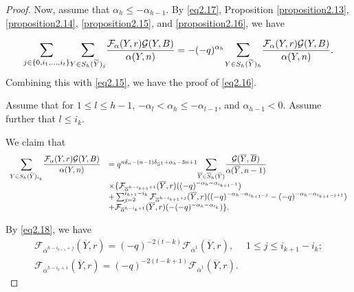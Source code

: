 \documentclass[11pt,oneside]{amsart}
\theoremstyle{plain}
\theoremstyle{definition}
\theoremstyle{remark}
\newcommand{\CF}{{\mathcal F}}
\newcommand{\CG}{{\mathcal G}}
\numberwithin{equation}{section}
\begin{document}
\begin{proof}
		Now, assume that $\alpha_h \leq -\alpha_{h-1}$. By \eqref{eq2.17}, Proposition \ref{proposition2.13}, \ref{proposition2.14}, \ref{proposition2.15}, and \ref{proposition2.16}, we have
		
		\begin{equation*}	\mathlarger{\sum}_{j \in \lbrace 0,i_1,\dots,i_t \rbrace}\mathlarger{\sum}_{Y \in S_h(\widetilde{Y})_{j}}	\dfrac{\CF_{\alpha}(Y,r)\CG(Y,B)}{\alpha(Y,n)}=-(-q)^{\alpha_h}\mathlarger{\sum}_{Y \in S_h(\widetilde{Y})_{h}}	\dfrac{\CF_{\alpha}(Y,r)\CG(Y,B)}{\alpha(Y,n)}.
		\end{equation*}
		Combining this with \eqref{eq2.15}, we have the proof of \eqref{eq2.16}. 
		
		
		
		Assume that for $1 \leq l \leq h-1$, $-\alpha_l<\alpha_h \leq -\alpha_{l-1}$, and $\alpha_{h-1}<0$.
		Assume further that $l \leq  i_k$. 
		
		We claim that
		\begin{equation}\label{eq2.20}\begin{array}{ll}
				\mathlarger{\sum}_{Y \in S_h(\widetilde{Y})_{i_k}}	\dfrac{\CF_{\alpha}(Y,r)\CG(Y,B)}{\alpha(Y,n)}&=q^{n\delta_{\alpha}-(n-1)\delta_{\overline{\alpha}^1}+\alpha_h-3n+1}\mathlarger{\sum}_{\overline{Y} \in \overline{S}_h(\widetilde{Y})}\dfrac{\CG(\overline{Y},\overline{B})}{\alpha(\overline{Y},n-1)}\\
				&\times \lbrace \CF_{\overline{\alpha}^{h-i_{k+1}+1}}(\overline{Y},r)((-q)^{-\alpha_h-\alpha_{i_{k+1}-1}})\\
				&+\sum_{j=2}^{i_{k+1}-i_k} \CF_{\overline{\alpha}^{h-i_{k+1}+j}}(\overline{Y},r)((-q)^{-\alpha_h-\alpha_{i_{k+1}-j}}-(-q)^{-\alpha_h-\alpha_{i_{k+1}-j+1}})\\
				&+\CF_{\overline{\alpha}^{h-i_{k}+1}}(\overline{Y},r)(-(-q)^{-\alpha_h-\alpha_{i_{k}}}) \rbrace.
			\end{array}
		\end{equation}
		
		By \eqref{eq2.18}, we have
		\begin{equation*}\begin{array}{ll}
				\CF_{\overline{\alpha}^{h-i_{k+1}+j}}(\overline{Y},r)=(-q)^{-2(t-k)}\CF_{\overline{\alpha}^1}(\overline{Y},r), & 1 \leq j \leq i_{k+1}-i_k;\\
				\CF_{\overline{\alpha}^{h-i_{k}+1}}(\overline{Y},r)=(-q)^{-2(t-k+1)}\CF_{\overline{\alpha}^1}(\overline{Y},r).&
			\end{array}
		\end{equation*}
		

\end{proof}
\end{document}
